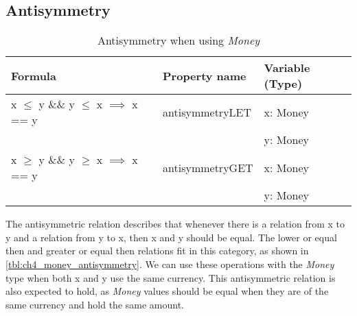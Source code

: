 \subsection*{Antisymmetry}
\FloatBarrier
\begin{table}[!ht]
\centering
\begin{tabular}{lll}
\hline
                        \textbf{Formula}                             & \textbf{Property name} & \textbf{Variable (Type)} \\ \hline
\rowcolor[HTML]{EFEFEF} x $\leq$ y \&\& y $\leq$ x $\implies$ x == y & antisymmetryLET        & x: Money                 \\
\rowcolor[HTML]{EFEFEF}                                              &                        & y: Money                 \\
                        x $\geq$ y \&\& y $\geq$ x $\implies$ x == y & antisymmetryGET        & x: Money                 \\
                                                                     &                        & y: Money                 \\ \hline
\end{tabular}
\caption{Antisymmetry when using \textit{Money}}
\label{tbl:ch4_money_antisymmetry}
\end{table}
\FloatBarrier
The antisymmetric relation describes that whenever there is a relation from x to y and a relation from y to x, then x and y should be equal. The lower or equal then and greater or equal then relations fit in this category, as shown in \autoref{tbl:ch4_money_antisymmetry}. We can use these operations with the \textit{Money} type when both x and y use the same currency. This antisymmetric relation is also expected to hold, as \textit{Money} values should be equal when they are of the same currency and hold the same amount.

